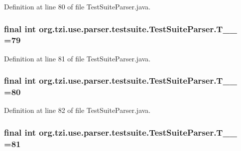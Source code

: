 Definition at line 80 of file Test\-Suite\-Parser.\-java.

\hypertarget{classorg_1_1tzi_1_1use_1_1parser_1_1testsuite_1_1_test_suite_parser_ab951f644bed2c2b46b97e8733da1c9e4}{
\subsubsection[{T\-\_\-\-\_\-79}]{\setlength{\rightskip}{0pt plus 5cm}final int org.\-tzi.\-use.\-parser.\-testsuite.\-Test\-Suite\-Parser.\-T\-\_\-\-\_ =79\hspace{0.3cm}{\ttfamily [static]}}}\label{classorg_1_1tzi_1_1use_1_1parser_1_1testsuite_1_1_test_suite_parser_ab951f644bed2c2b46b97e8733da1c9e4}


Definition at line 81 of file Test\-Suite\-Parser.\-java.

\hypertarget{classorg_1_1tzi_1_1use_1_1parser_1_1testsuite_1_1_test_suite_parser_a4465927275f355f60c89cfc3a0f70b9f}{
\subsubsection[{T\-\_\-\-\_\-80}]{\setlength{\rightskip}{0pt plus 5cm}final int org.\-tzi.\-use.\-parser.\-testsuite.\-Test\-Suite\-Parser.\-T\-\_\-\-\_ =80\hspace{0.3cm}{\ttfamily [static]}}}\label{classorg_1_1tzi_1_1use_1_1parser_1_1testsuite_1_1_test_suite_parser_a4465927275f355f60c89cfc3a0f70b9f}


Definition at line 82 of file Test\-Suite\-Parser.\-java.

\hypertarget{classorg_1_1tzi_1_1use_1_1parser_1_1testsuite_1_1_test_suite_parser_a00ee0bbd6252c06e1c8da17c2793d4c1}{
\subsubsection[{T\-\_\-\-\_\-81}]{\setlength{\rightskip}{0pt plus 5cm}final int org.\-tzi.\-use.\-parser.\-testsuite.\-Test\-Suite\-Parser.\-T\-\_\-\-\_ =81\hspace{0.3cm}{\ttfamily [static]}}}\label{classorg_1_1tzi_1_1use_1_1parser_1_1testsuite_1_1_test_suite_parser_a00ee0bbd6252c06e1c8da17c2793d4c1}


